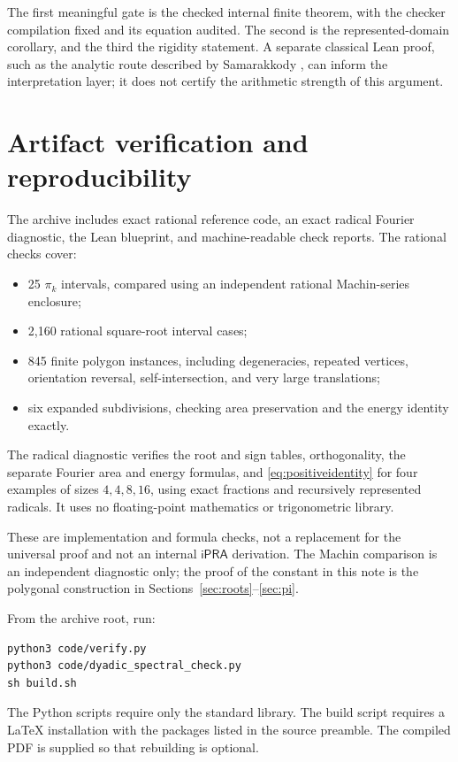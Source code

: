 \documentclass[11pt,a4paper]{article}
\theoremstyle{definition}
\newcommand{\ipra}{\mathsf{iPRA}}
\begin{document}
The first meaningful gate is the checked internal finite theorem,
with the checker compilation fixed and its equation audited.
The second is the represented-domain corollary, and the third the
rigidity statement. A separate classical Lean proof, such as the
analytic route described by Samarakkody \cite{samarakkody}, can inform
the interpretation layer; it does not certify the arithmetic strength
of this argument.

\section{Artifact verification and reproducibility}
The archive includes exact rational reference code, an exact radical
Fourier diagnostic, the Lean blueprint, and machine-readable check
reports. The rational checks cover:
\begin{itemize}
\item 25 \(\pi_k\) intervals, compared using an independent rational
Machin-series enclosure;
\item 2,160 rational square-root interval cases;
\item 845 finite polygon instances, including degeneracies, repeated
vertices, orientation reversal, self-intersection, and very large
translations;
\item six expanded subdivisions, checking area preservation and the
energy identity exactly.
\end{itemize}
The radical diagnostic verifies the root and sign tables,
orthogonality, the separate Fourier area and energy formulas, and
\eqref{eq:positiveidentity} for four examples of sizes
\(4,4,8,16\), using exact fractions and recursively represented
radicals. It uses no floating-point mathematics or trigonometric
library.

These are implementation and formula checks, not a replacement for
the universal proof and not an internal \(\ipra\) derivation.
The Machin comparison is an independent diagnostic only; the proof
of the constant in this note is the polygonal construction in
Sections~\ref{sec:roots}--\ref{sec:pi}.

From the archive root, run:
\begin{lstlisting}
python3 code/verify.py
python3 code/dyadic_spectral_check.py
sh build.sh
\end{lstlisting}
The Python scripts require only the standard library.
The build script requires a LaTeX installation with the packages
listed in the source preamble. The compiled PDF is supplied so that
rebuilding is optional.
\end{document}
